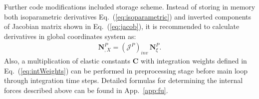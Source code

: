 Further code modifications included storage scheme.
Instead of storing in memory both isoparametric derivatives Eq.~(\ref{eq:isoparametric}) and inverted components of Jacobian matrix shown in Eq.~(\ref{eq:jacob}), it is recommended to calculate derivatives in global coordinates system as:
\begin{eqnarray}
	\textbf{N}^P_{,X} = \left(\mathcal{J}^P\right)_{inv}\,\textbf{N}^P_{\xi}.
\end{eqnarray}
Also, a multiplication of elastic constants \(\textbf{C}\) with integration weights defined in Eq.~(\ref{eq:intWeights}) can be performed in preprocessing stage before main loop through integration time steps.
Detailed formulas for determining the internal forces described above can be found in App.~\ref{app:fu}.

